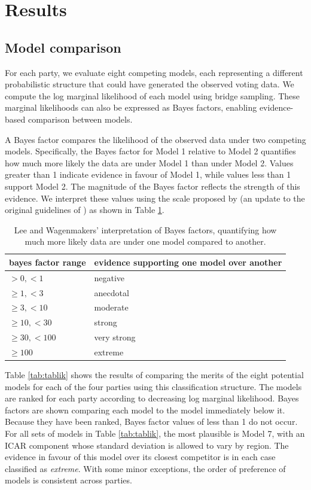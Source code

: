 \documentclass[webpdf,large,contemporary,namedate]{oup-authoring-template}
\theoremstyle{thmstyleone}
\theoremstyle{thmstyletwo}
\theoremstyle{thmstylethree}
\begin{document}
\section{Results}\label{results}

\subsection{Model comparison}\label{model-comparison}

For each party, we evaluate eight competing models, each representing a
different probabilistic structure that could have generated the observed
voting data. We compute the log marginal likelihood of each model using
bridge sampling. These marginal likelihoods can also be expressed as
Bayes factors, enabling evidence-based comparison between models.

A Bayes factor compares the likelihood of the observed data under two
competing models. Specifically, the Bayes factor for Model 1 relative to
Model 2 quantifies how much more likely the data are under Model 1 than
under Model 2. Values greater than 1 indicate evidence in favour of
Model 1, while values less than 1 support Model 2. The magnitude of the
Bayes factor reflects the strength of this evidence. We interpret these
values using the scale proposed by \citet{Lee2014} (an update to the
original guidelines of \citet{jeffreys1939}) as shown in Table
\ref{tab:tablewagenmakers}.

\begin{table}

\caption{\label{tab:tablewagenmakers}Lee and Wagenmakers' interpretation of Bayes factors, quantifying how much more likely data are under one model compared to another.}
\centering
\begin{tabular}[t]{l|l}
\hline
bayes factor range & evidence supporting one model over another\\
\hline
$> 0, < 1$ & negative\\
\hline
$\geq 1, < 3$ & anecdotal\\
\hline
$\geq 3, < 10$ & moderate\\
\hline
$\geq 10, < 30$ & strong\\
\hline
$\geq 30, < 100$ & very strong\\
\hline
$\geq 100$ & extreme\\
\hline
\end{tabular}
\end{table}

Table \ref{tab:tablik} shows the results of comparing the merits of the
eight potential models for each of the four parties using this
classification structure. The models are ranked for each party according
to decreasing log marginal likelihood. Bayes factors are shown comparing
each model to the model immediately below it. Because they have been
ranked, Bayes factor values of less than 1 do not occur. For all sets of
models in Table \ref{tab:tablik}, the most plausible is Model 7, with an
ICAR component whose standard deviation is allowed to vary by region.
The evidence in favour of this model over its closest competitor is in
each case classified as \textit{extreme}. With some minor exceptions,
the order of preference of models is consistent across parties.
\end{document}
